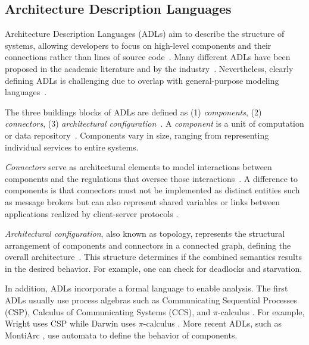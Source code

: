 \documentclass[runningheads]{llncs}
\begin{document}
\subsection{Architecture Description Languages} \label{subsec:adl}
Architecture Description Languages (ADLs) aim to describe the structure of systems, allowing developers to focus on high-level components and their connections rather than lines of source code~\cite{clementsSurveyArchitectureDescription1996,medvidovicClassificationComparisonFramework2000,medvidovicFrameworkClassifyingComparing1997}.
Many different ADLs have been proposed in the academic literature and by the industry~\cite{medvidovicClassificationComparisonFramework2000,woodsArchitectureDescriptionLanguages2005}.
Nevertheless, clearly defining ADLs is challenging due to overlap with general-purpose modeling languages~\cite{clementsSurveyArchitectureDescription1996}.

The three buildings blocks of ADLs are defined as (1) \textit{components}, (2) \textit{connectors}, (3) \textit{architectural configuration}~\cite{medvidovicClassificationComparisonFramework2000,medvidovicFrameworkClassifyingComparing1997}.
A \textit{component} is a unit of computation or data repository~\cite{medvidovicClassificationComparisonFramework2000}.
Components vary in size, ranging from representing individual services to entire systems.

\textit{Connectors} serve as architectural elements to model interactions between components and the regulations that oversee those interactions~\cite{medvidovicClassificationComparisonFramework2000}.
A difference to components is that connectors must not be implemented as distinct entities such as message brokers but can also represent shared variables or links between applications realized by client-server protocols \cite{medvidovicClassificationComparisonFramework2000}.

\textit{Architectural configuration}, also known as topology, represents the structural arrangement of components and connectors in a connected graph, defining the overall architecture~\cite{medvidovicClassificationComparisonFramework2000}.
This structure determines if the combined semantics results in the desired behavior.
For example, one can check for deadlocks and starvation.

In addition, ADLs incorporate a formal language to enable analysis.
The first ADLs usually use process algebras such as Communicating Sequential Processes (CSP), Calculus of Communicating Systems (CCS), and $\pi$-calculus \cite{ozkayaAreWeThere2013}.
For example, Wright uses CSP \cite{allenFormalBasisArchitectural1997} while Darwin uses $\pi$-calculus \cite{mageeSpecifyingDistributedSoftware1995}.
More recent ADLs, such as MontiArc \cite{haberMontiArcArchitecturalModeling2014}, use automata to define the behavior of components.
\end{document}
